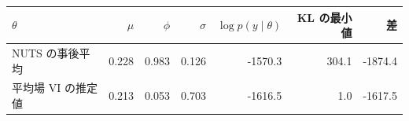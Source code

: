 \begin{tabular}{lrrrrrr}
\toprule
$\theta$ & $\mu$ & $\phi$ & $\sigma$ & $\log p(y \mid \theta)$ & KL の最小値 & 差 \\
\midrule
NUTS の事後平均 & 0.228 & 0.983 & 0.126 & -1570.3 & 304.1 & -1874.4 \\
平均場 VI の推定値 & 0.213 & 0.053 & 0.703 & -1616.5 & 1.0 & -1617.5 \\
\bottomrule
\end{tabular}
